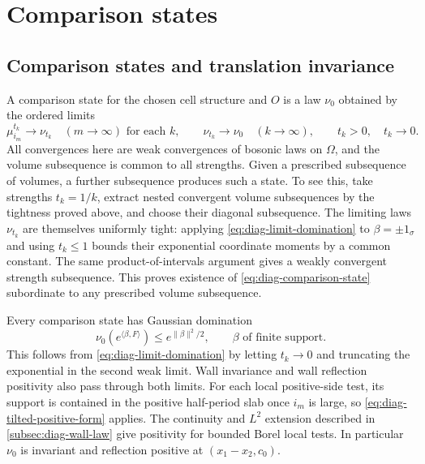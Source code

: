 \documentclass[11pt,letterpaper,reqno]{amsart}
\begin{document}
\section{Comparison states}\label{sec:comparison-states}

\subsection{Comparison states and translation invariance}\label{subsec:diag-comparison-states}

A comparison state for the chosen cell structure and $O$ is
a law $\nu_0$ obtained by the ordered limits
\begin{equation}\label{eq:diag-comparison-state}
 \mu_{i_m}^{t_k}\longrightarrow\nu_{t_k}
       \quad(m\to\infty)\text{ for each }k,
 \qquad
 \nu_{t_k}\longrightarrow\nu_0\quad(k\to\infty),
 \qquad t_k>0,\quad t_k\to0.
\end{equation}
All convergences here are weak convergences of bosonic laws on
$\Omega$, and the volume subsequence is common to all strengths.
Given a prescribed subsequence of volumes, a further subsequence
produces such a state. To see this, take strengths $t_k=1/k$,
extract nested convergent volume subsequences by the tightness
proved above, and choose their diagonal subsequence. The limiting
laws $\nu_{t_k}$ are themselves uniformly tight: applying
\eqref{eq:diag-limit-domination} to $\beta=\pm1_\sigma$ and
using $t_k\le1$ bounds their exponential coordinate moments
by a common constant. The same product-of-intervals argument
gives a weakly convergent strength subsequence. This proves
existence of \eqref{eq:diag-comparison-state} subordinate to
any prescribed volume subsequence.

Every comparison state has Gaussian domination
\begin{equation}\label{eq:diag-comparison-domination}
 \nu_0(e^{\langle\beta,F\rangle})\le e^{\|\beta\|^2/2},
                         \qquad\beta\text{ of finite support}.
\end{equation}
This follows from \eqref{eq:diag-limit-domination} by letting
$t_k\to0$ and truncating the exponential in the second weak
limit. Wall invariance and wall reflection positivity also
pass through both limits. For each local positive-side test,
its support is contained in the positive half-period slab
once $i_m$ is large, so \eqref{eq:diag-tilted-positive-form}
applies. The continuity and $L^2$ extension described in
\cref{subsec:diag-wall-law} give positivity for bounded Borel
local tests. In particular $\nu_0$ is invariant and reflection
positive at $(x_1-x_2,c_0)$.
\end{document}
